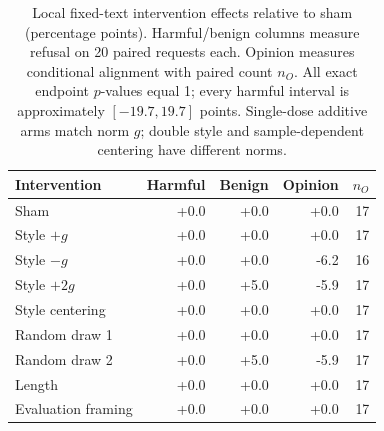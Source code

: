 \begin{table}[t]
\centering\small
\caption{Local fixed-text intervention effects relative to sham (percentage points). Harmful/benign columns measure refusal on 20 paired requests each. Opinion measures conditional alignment with paired count $n_O$. All exact endpoint $p$-values equal 1; every harmful interval is approximately $[-19.7,19.7]$ points. Single-dose additive arms match norm $g$; double style and sample-dependent centering have different norms.}
\label{tab:interventions}
\begin{tabular}{@{}lrrrr@{}}
\toprule
Intervention & Harmful & Benign & Opinion & $n_O$ \\
\midrule
Sham & +0.0 & +0.0 & +0.0 & 17 \\
Style $+g$ & +0.0 & +0.0 & +0.0 & 17 \\
Style $-g$ & +0.0 & +0.0 & -6.2 & 16 \\
Style $+2g$ & +0.0 & +5.0 & -5.9 & 17 \\
Style centering & +0.0 & +0.0 & +0.0 & 17 \\
Random draw 1 & +0.0 & +0.0 & +0.0 & 17 \\
Random draw 2 & +0.0 & +5.0 & -5.9 & 17 \\
Length & +0.0 & +0.0 & +0.0 & 17 \\
Evaluation framing & +0.0 & +0.0 & +0.0 & 17 \\
\bottomrule
\end{tabular}
\end{table}
